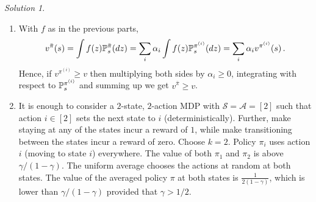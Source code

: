 \documentclass{article}
\DeclareMathOperator*{\1}{\mathbbm{1}}
\newcommand{\0}{\mathbf{0}}
\theoremstyle{definition}
\theoremstyle{remark}
\newtheorem*{solution*}{Solution}
\theoremstyle{theorem}
\newcommand{\cS}{\mathcal{S}}
\newcommand{\cA}{\mathcal{A}}
\begin{document}
\begin{solution*}
\begin{enumerate}
\item With $f$ as in the previous parts,
\begin{align*}
v^{\bar \pi}(s) = \int f(z) \mathbb{P}_s^{\bar \pi}(dz)
= \sum_i \alpha_i \int f(z) \mathbb{P}_{s}^{\pi^{(i)}}(dz) = \sum_i \alpha_i v^{\pi^{(i)}}(s)\,.
\end{align*}
Hence, if $v^{\pi^{(i)}}\ge v$ then multiplying both sides by $\alpha_i\ge 0$,
integrating with respect to $\mathbb{P}_s^{\pi^{(i)}}$ and summing up we get
$v^{\bar \pi} \ge v$.

\item It is enough to consider a $2$-state, $2$-action MDP with $\cS = \cA = [2]$ such that action $i\in [2]$ sets the next state to $i$ (deterministically). Further, make staying at any of the states incur a reward of $1$, while make transitioning between the states incur a reward of zero.
Choose $k=2$. Policy $\pi_i$ uses action $i$ (moving to state $i$) everywhere.
The value of both $\pi_1$ and $\pi_2$ is above $\gamma/(1-\gamma)$. The uniform average chooses the actions at random at both states.
The value of the averaged policy $\pi$ at both states is $\frac{1}{2(1-\gamma)}$, which is lower than $\gamma/(1-\gamma)$ provided that $\gamma> 1/2$.





\end{enumerate}
\end{solution*}
\end{document}
